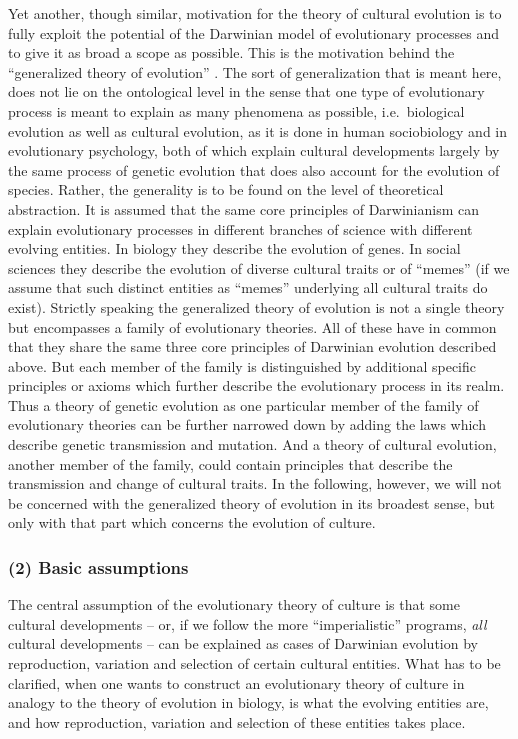Yet another, though similar, motivation for the theory of cultural evolution
is to fully exploit the potential of the Darwinian model of evolutionary
processes and to give it as broad a scope as possible.  This is the motivation
behind the ``generalized theory of evolution'' \cite[]{schurz:2001}. The sort
of generalization that is meant here, does not lie on the ontological level in
the sense that one type of evolutionary process is meant to explain as many
phenomena as possible, i.e.\ biological evolution as well as cultural
evolution, as it is done in human sociobiology and in evolutionary psychology,
both of which explain cultural developments largely by the same process of
genetic evolution that does also account for the evolution of species.
Rather, the generality is to be found on the level of theoretical abstraction.
It is assumed that the same core principles of Darwinianism can explain
evolutionary processes in different branches of science with different
evolving entities. In biology they describe the evolution of genes. In social
sciences they describe the evolution of diverse cultural traits or of
``memes'' (if we assume that such distinct entities as ``memes'' underlying
all cultural traits do exist).  Strictly speaking the generalized theory of
evolution is not a single theory but encompasses a family of evolutionary
theories. All of these have in common that they share the same three core
principles of Darwinian evolution described above. But each member of
the family is distinguished by additional specific principles or axioms which
further describe the evolutionary process in its realm. Thus a theory of
genetic evolution as one particular member of the family of
evolutionary theories can be further narrowed down by adding the laws which
describe genetic transmission and mutation. And a theory of cultural
evolution, another member of the family, could contain principles that
describe the transmission and change of cultural traits. In the following,
however, we will not be concerned with the generalized theory of evolution in
its broadest sense, but only with that part which concerns the evolution of
culture.

\subsubsection{(2) Basic assumptions} 

The central assumption of the evolutionary
theory of culture is that some cultural developments -- or, if we follow the
more ``imperialistic'' programs, {\em all} cultural developments -- can be
explained as cases of Darwinian evolution by reproduction, variation and
selection of certain cultural entities. What has to be clarified, when one
wants to construct an evolutionary theory of culture in analogy to the theory
of evolution in biology, is what the evolving entities are, and how
reproduction, variation and selection of these entities takes place.

